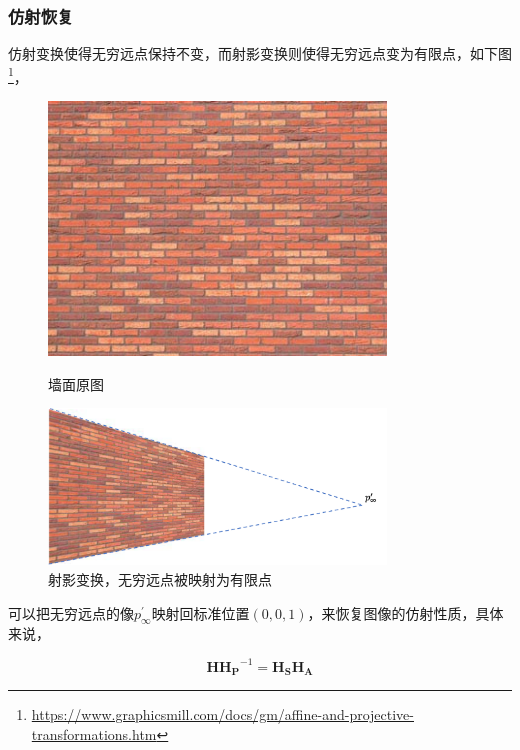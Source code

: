 \documentclass[hpyerref,UTF8,a4paper,titlepage,12pt,oneside]{ctexbook}
\theoremstyle{definition}
\begin{document}
	\subsubsection{仿射恢复}

		仿射变换使得无穷远点保持不变，而射影变换则使得无穷远点变为有限点，如下图\footnote{\url{https://www.graphicsmill.com/docs/gm/affine-and-projective-transformations.htm}}，

		\begin{figure}[H]
			\begin{minipage}[t]{0.52\linewidth}
				\centering
				\includegraphics[width=0.8\textwidth]{images/origin_.jpeg}
				\caption{墙面原图}
			\end{minipage}
			\begin{minipage}[t]{0.78\linewidth}
				\centering
				\includegraphics[width=0.8\textwidth]{images/projective_.png}
				\caption{射影变换，无穷远点被映射为有限点}
			\end{minipage}			
		\end{figure}

		可以把无穷远点的像$p^{\prime}_{\infty}$映射回标准位置$(0,0,1)$，来恢复图像的仿射性质，具体来说，

		$$
			\mathbf{H}\mathbf{H_P}^{-1} = \mathbf{H_S}\mathbf{H_A}
		$$
\end{document}
